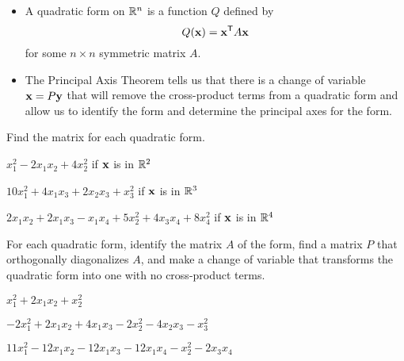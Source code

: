 
\begin{itemize}
\item A quadratic form on $\mathbb{R}^n$ is a function $Q$ defined by
\[Q(\mathbf{x}) = \mathbf{x}^{\mathsf{T}} A \mathbf{x}\]
for some $n \times n$ symmetric matrix $A$.
\item The Principal Axis Theorem tells us that there is a change of variable $\mathbf{x} = P\mathbf{y}$ that will remove the cross-product terms from a quadratic form and allow us to identify the form and determine the principal axes for the form. 
\end{itemize}


\be
\item Find the matrix for each quadratic form.
	\ba
	\item $x_1^2 - 2x_1x_2 + 4x_2^2$ if $\mathbf{x}$ is in $\mathbb{R}^2$
	\item $10x_1^2 + 4x_1x_3 + 2x_2x_3 + x_3^2$ if $\mathbf{x}$ is in $\mathbb{R}^3$
	\item $2x_1x_2 + 2x_1x_3 - x_1x_4 + 5x_2^2 + 4x_3x_4 + 8x_4^2$ if $\mathbf{x}$ is in $\mathbb{R}^4$
	\ea
	
\item For each quadratic form, identify the matrix $A$ of the form, find a matrix $P$ that orthogonally diagonalizes $A$, and make a change of variable that transforms the quadratic form into one with no cross-product terms. 
	\ba
	\item $x_1^2+2x_1x_2+x_2^2$
	\item $-2x_1^2+2x_1x_2+4x_1x_3-2x_2^2-4x_2x_3-x_3^2$
	\item $11x_1^2-12x_1x_2-12x_1x_3-12x_1x_4-x_2^2-2x_3x_4$
	\ea

